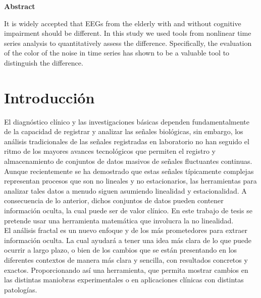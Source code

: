 \documentclass[letterpaper,titlepage,12pt,draft]{report}
\begin{document}
\vspace{2cm}
\begin{flushleft}
{\bf {\huge Abstract}}\\
\end{flushleft}
\vspace{1cm}

It is widely accepted that EEGs from the elderly with and without cognitive impairment should be
different. In this study we used tools from nonlinear time series analysis to quantitatively
assess the difference. Specifically, the evaluation of the color of the noise in time series has
shown to be a valuable tool to distinguish the difference.

\newpage
\tableofcontents
\cleardoublepage

\newpage
{} %
\chapter*{Introducci\'on} %

El diagn\'ostico cl\'inico y las investigaciones b\'asicas dependen fundamentalmente de la capacidad de registrar y analizar las se\~nales biol\'ogicas, sin embargo, los an\'alisis tradicionales de las se\~nales registradas en laboratorio no han seguido el ritmo de los mayores avances tecnol\'ogicos que permiten el registro y almacenamiento de conjuntos de datos masivos de se\~nales fluctuantes continuas. Aunque recientemente se ha demostrado que estas se\~nales t\'ipicamente complejas representan procesos que son no lineales y no estacionarios, las herramientas para analizar tales datos a menudo siguen asumiendo linealidad y estacionalidad. A consecuencia de lo anterior, dichos conjuntos de datos pueden contener informaci\'on oculta, la cual puede ser de valor cl\'inico. En este trabajo de tesis se pretende usar una herramienta matem\'atica que involucra la no linealidad.\\

 El an\'alisis fractal es un nuevo enfoque y de los m\'as prometedores para extraer informaci\'on oculta. La cual ayudar\'a a tener una idea m\'as clara de lo que puede ocurrir a largo plazo, o bien de los cambios que se est\'an presentando en los diferentes contextos de manera m\'as clara y sencilla, con resultados concretos y exactos. Proporcionando as\'i una herramienta, que permita mostrar cambios en las distintas maniobras experimentales o en aplicaciones cl\'inicas con distintas patolog\'ias.\\
 
\end{document}
